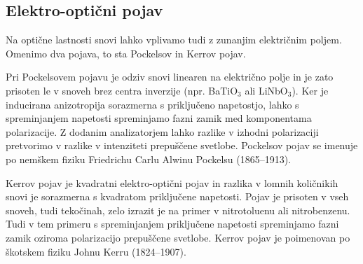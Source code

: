 \subsection*{Elektro-optični pojav}
Na optične lastnosti snovi lahko vplivamo tudi z zunanjim električnim poljem. Omenimo 
dva pojava, to sta Pockelsov in Kerrov pojav. 

Pri Pockelsovem
pojavu je odziv snovi linearen na električno polje in je zato prisoten le v snoveh
brez centra inverzije (npr. BaTiO$_3$ ali LiNbO$_3$). Ker je inducirana anizotropija sorazmerna
s priključeno napetostjo, lahko s spreminjanjem napetosti spreminjamo fazni zamik med 
komponentama polarizacije. Z dodanim analizatorjem lahko razlike v izhodni polarizaciji
pretvorimo v razlike v intenziteti prepuščene svetlobe. Pockelsov pojav se imenuje po
nemškem fiziku Friedrichu Carlu Alwinu Pockelsu (1865--1913).

Kerrov pojav je kvadratni elektro-optični pojav in razlika v lomnih količnikih snovi 
je sorazmerna s kvadratom priključene napetosti. Pojav je prisoten v vseh snoveh, tudi
tekočinah, zelo izrazit je na primer v nitrotoluenu ali nitrobenzenu. Tudi v tem 
primeru s spreminjanjem priključene napetosti spreminjamo fazni zamik oziroma polarizacijo
prepuščene svetlobe. Kerrov pojav je poimenovan po škotskem fiziku Johnu Kerru (1824--1907).
